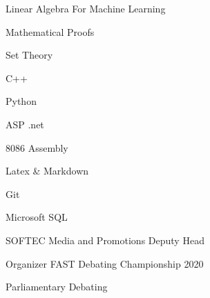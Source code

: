 \vspace{0.2mm}

\smallskip

\textbullet{} Linear Algebra For Machine Learning

\textbullet{} Mathematical Proofs

\textbullet{} Set Theory


\smallskip

\textbullet{} C++ 

\textbullet{} Python 

\textbullet{} ASP .net 

\textbullet{} 8086 Assembly 

\textbullet{} Latex \& Markdown 

\textbullet{} Git 

\textbullet{} Microsoft SQL
 


\newline
{}\newline
{}\newline
{}\newline
{}\newline
{}\newline
{}\newline
{}\newline
{}\newline
 \divider

\textbullet{} SOFTEC Media and Promotions Deputy Head
\newline

\textbullet{} Organizer FAST Debating Championship 2020 
\newline

\textbullet{} Parliamentary Debating
\newline



\smallskip





